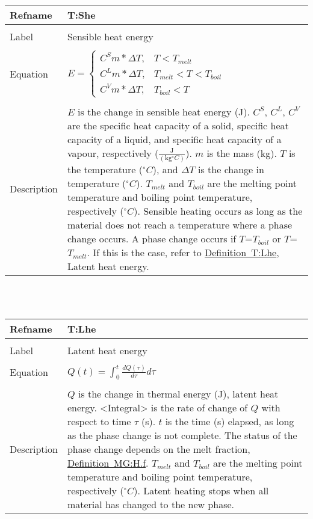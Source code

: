 \documentclass[12pt]{article}
\begin{document}
\noindent \begin{minipage}{\textwidth}
\begin{tabular}{p{} p{}}
\toprule \textbf{Refname} & \textbf{T:She}
\label{T:She}
\\ \midrule \\
Label & Sensible heat energy
\\ \midrule \\
Equation & $E=\begin{cases}
C^{S}m*\Delta{}T, & T<T_{melt}\\
C^{L}m*\Delta{}T, & T_{melt}<T<T_{boil}\\
C^{V}m*\Delta{}T, & T_{boil}<T
\end{cases}$
\\ \midrule \\
Description & $E$ is the change in sensible heat energy (J). $C^{S}$, $C^{L}$, $C^{V}$ are the specific heat capacity of a solid, specific heat capacity of a liquid, and specific heat capacity of a vapour, respectively ($\frac{\text{J}}{(\text{kg}{}^{\circ}C)}$). $m$ is the mass (kg). $T$ is the temperature (${}^{\circ}C$), and $\Delta{}T$ is the change in temperature (${}^{\circ}C$). $T_{melt}$ and $T_{boil}$ are the melting point temperature and boiling point temperature, respectively (${}^{\circ}C$). Sensible heating occurs as long as the material does not reach a temperature where a phase change occurs. A phase change occurs if $T$=$T_{boil}$ or $T$=$T_{melt}$. If this is the case, refer to \hyperref[T:Lhe]{Definition~T:Lhe}, Latent heat energy.
\\ \bottomrule \end{tabular}
\end{minipage}\\
~\newline
\noindent \begin{minipage}{\textwidth}
\begin{tabular}{p{} p{}}
\toprule \textbf{Refname} & \textbf{T:Lhe}
\label{T:Lhe}
\\ \midrule \\
Label & Latent heat energy
\\ \midrule \\
Equation & $Q(t)=\int_{0}^{t}{\frac{dQ(\tau{})}{d\tau{}}d\tau{}}$
\\ \midrule \\
Description & $Q$ is the change in thermal energy (J), latent heat energy. <Integral> is the rate of change of $Q$ with respect to time $\tau{}$ (s). $t$ is the time (s) elapsed, as long as the phase change is not complete. The status of the phase change depends on the melt fraction, \hyperref[MG:H.f]{Definition~MG:H.f}. $T_{melt}$ and $T_{boil}$ are the melting point temperature and boiling point temperature, respectively (${}^{\circ}C$). Latent heating stops when all material has changed to the new phase.
\\ \bottomrule \end{tabular}
\end{minipage}\\
\end{document}
